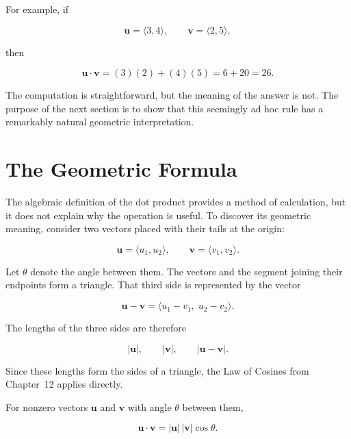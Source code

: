 For example, if

\[
\mathbf{u}=\langle 3,4\rangle,
\qquad
\mathbf{v}=\langle 2,5\rangle,
\]

then

\[
\mathbf{u}\cdot\mathbf{v}
=
(3)(2)+(4)(5)
=
6+20
=
26.
\]

The computation is straightforward, but the meaning of the answer is not.
The purpose of the next section is to show that this seemingly ad hoc rule
has a remarkably natural geometric interpretation.

\section{The Geometric Formula}

The algebraic definition of the dot product provides a method of
calculation, but it does not explain why the operation is useful. To
discover its geometric meaning, consider two vectors placed with their
tails at the origin:

\[
\mathbf{u}=\langle u_1,u_2\rangle,
\qquad
\mathbf{v}=\langle v_1,v_2\rangle.
\]

Let $\theta$ denote the angle between them. The vectors and the segment
joining their endpoints form a triangle. That third side is represented by
the vector

\[
\mathbf{u}-\mathbf{v}
=
\langle u_1-v_1,\;u_2-v_2\rangle.
\]

The lengths of the three sides are therefore

\[
|\mathbf{u}|,
\qquad
|\mathbf{v}|,
\qquad
|\mathbf{u}-\mathbf{v}|.
\]

Since these lengths form the sides of a triangle, the Law of Cosines from
Chapter~12 applies directly.

\begin{theorem}
For nonzero vectors $\mathbf{u}$ and $\mathbf{v}$ with angle $\theta$
between them,

\[
\mathbf{u}\cdot\mathbf{v}
=
|\mathbf{u}|\,|\mathbf{v}|\cos\theta.
\]
\end{theorem}

